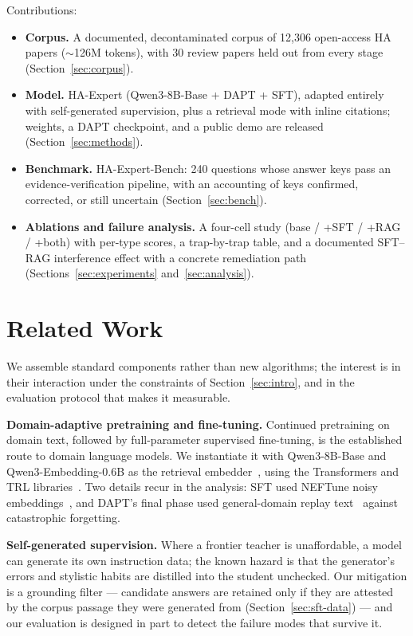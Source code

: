 \documentclass[11pt]{article}
\begin{document}
Contributions:
\begin{itemize}
\item \textbf{Corpus.} A documented, decontaminated corpus of 12,306
open-access HA papers ($\sim$126M tokens), with 30 review papers held out
from every stage (Section~\ref{sec:corpus}).
\item \textbf{Model.} HA-Expert (Qwen3-8B-Base + DAPT + SFT), adapted
entirely with self-generated supervision, plus a retrieval mode with
inline citations; weights, a DAPT checkpoint, and a public demo are
released (Section~\ref{sec:methods}).
\item \textbf{Benchmark.} HA-Expert-Bench: 240 questions whose answer
keys pass an evidence-verification pipeline, with an accounting of
keys confirmed, corrected, or still uncertain
(Section~\ref{sec:bench}).
\item \textbf{Ablations and failure analysis.} A four-cell study
(base / +SFT / +RAG / +both) with per-type scores, a trap-by-trap table,
and a documented SFT--RAG interference effect with a concrete
remediation path (Sections~\ref{sec:experiments}
and~\ref{sec:analysis}).
\end{itemize}

\section{Related Work}
\label{sec:related}

We assemble standard components rather than new algorithms; the interest
is in their interaction under the constraints of Section~\ref{sec:intro},
and in the evaluation protocol that makes it measurable.

\textbf{Domain-adaptive pretraining and fine-tuning.} Continued
pretraining on domain text, followed by
full-parameter supervised fine-tuning, is the established route to domain
language models. We instantiate it with Qwen3-8B-Base and
Qwen3-Embedding-0.6B as the retrieval
embedder~\cite{qwen3}, using the Transformers and TRL
libraries~\cite{transformers,trl}. Two details recur in the analysis:
SFT used NEFTune noisy embeddings~\cite{neftune}, and DAPT's final phase
used general-domain replay text~\cite{fineweb}
against catastrophic forgetting.

\textbf{Self-generated supervision.} Where a frontier teacher is
unaffordable, a model can generate its own instruction data; the known
hazard is that the generator's errors and stylistic habits are distilled
into the student unchecked. Our mitigation is a grounding filter ---
candidate answers are retained only if they are attested by the corpus
passage they were generated from (Section~\ref{sec:sft-data}) --- and
our evaluation is designed in part to detect the failure modes that
survive it.
\end{document}
